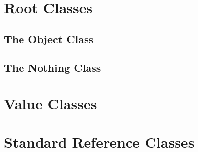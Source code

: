 \section{Root Classes}

\subsection{The Object Class}

\subsection{The Nothing Class}

\section{Value Classes}

\section{Standard Reference Classes}



















